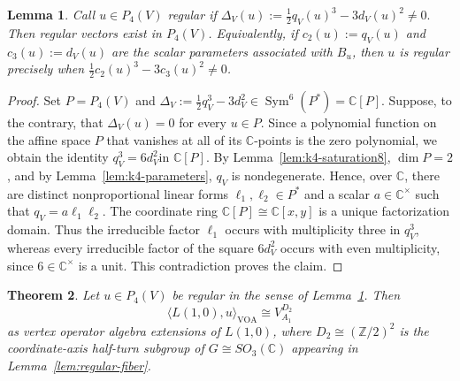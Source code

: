 \documentclass[10pt,a4paper]{amsart}
\numberwithin{equation}{section} \newtheorem{thm}{Theorem}[section] \newtheorem{lem}[thm]{Lemma} \newtheorem{ex}[thm]{Example} \newtheorem{prop}[thm]{Proposition} \newtheorem{cor}[thm]{Corollary} \newtheorem{defi}[thm]{Definition} \newtheorem{rmk}[thm]{Remark} \newtheorem{notation}[thm]{Notation}
\newcommand{\Sym}{\operatorname{Sym}}
\def\Z{\mathbb{Z}} \def\N{\mathbb{N}} \def\A{\mathbb{A}} \def\C{\mathbb{C}} \def\R{\mathbb{R}} \def\Q{\mathbb{Q}} \def\F{\mathbb{F}}
\begin{document}
\begin{lem}\label{lem:regular-primary}
Call $u\in P_4(V)$ \emph{regular} if \(\Delta_V(u):=\frac12q_V(u)^3-3d_V(u)^2\ne0.\) Then regular vectors exist in $P_4(V)$. Equivalently, if \(c_2(u):=q_V(u)\) and \(c_3(u):=d_V(u)\) are the scalar parameters associated with $B_u$, then $u$ is regular precisely when \(\frac12c_2(u)^3-3c_3(u)^2\ne0\).
\end{lem}

\begin{proof}
Set $P=P_4(V)$ and \(\Delta_V:=\frac12q_V^3-3d_V^2\in\Sym^6(P^*)=\C[P]\). Suppose, to the contrary, that $\Delta_V(u)=0$ for every $u\in P$. Since a polynomial function on the affine space $P$ that vanishes at all of its $\C$-points is the zero polynomial, we obtain the identity \(q_V^3=6d_V^2 \text{in }\C[P].\) By Lemma~\ref{lem:k4-saturation8}, $\dim P=2$, and by Lemma~\ref{lem:k4-parameters}, $q_V$ is nondegenerate. Hence, over $\C$, there are distinct nonproportional linear forms $\ell_1,\ell_2\in P^*$ and a scalar $a\in\C^\times$ such that \(q_V=a\ell_1\ell_2\). The coordinate ring \(\C[P]\cong\C[x,y]\) is a unique factorization domain. Thus the irreducible factor $\ell_1$ occurs with multiplicity three in $q_V^3$, whereas every irreducible factor of the square $6d_V^2$ occurs with even multiplicity, since $6\in\C^\times$ is a unit. This contradiction proves the claim.
\end{proof}

\begin{thm}\label{thm:k4-D2}
Let $u\in P_4(V)$ be regular in the sense of Lemma~\ref{lem:regular-primary}. Then
\[
\langle L(1,0),u\rangle_{\mathrm{VOA}}\cong V_{A_1}^{D_2}
\]
as vertex operator algebra extensions of $L(1,0)$, where $D_2\cong(\Z/2)^2$ is the coordinate-axis half-turn subgroup of $G\cong SO_3(\C)$ appearing in Lemma~\ref{lem:regular-fiber}.
\end{thm}
\end{document}
